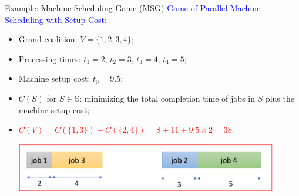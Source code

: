 \documentclass[14pt]{beamer}
\begin{document}
\begin{frame}{Example: Machine Scheduling Game (MSG)}
\small
\textcolor{blue}{Game of Parallel Machine Scheduling with Setup Cost:}
\vspace{2mm}
	\begin{itemize}
	\justifying
		\item Grand coalition: $V = \big\{ 1,2,3,4 \big\}$;
		\item Processing times: $t_1=2$, $t_2=3$, $t_3=4$, $t_4=5$;
		\item Machine setup cost: $t_0 = 9.5$;
		\item $C(S)$ for $S\in \mathbb{S}$:  minimizing the total completion time of jobs in $S$ plus the machine setup cost;
		\item \textcolor{red}{$C(V)= C(\{1,3\}) + C(\{2,4\})= 8 + 11 + 9.5\times 2 = 38$.}

\centering
\hspace{-1cm}
\includegraphics[width = 0.9\textwidth]{Figures/m1.png}

\end{itemize}
\end{frame}
\end{document}
